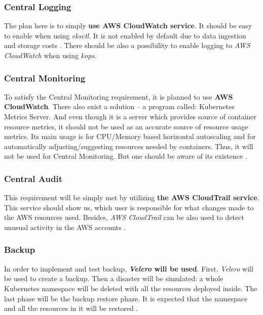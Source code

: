 \subsubsection{Central Logging}

The plan here is to simply \textbf{use AWS CloudWatch service}. It should be easy to enable when using \textit{eksctl}. It is not enabled by default due to data ingestion and storage costs \cite{eksctl-cw}. There should be also a possibility to enable logging to \textit{AWS CloudWatch} when using \textit{kops}.

\subsubsection{Central Monitoring}

To satisfy the Central Monitoring requirement, it is planned to use \textbf{AWS CloudWatch}. There also exist a solution -- a program called: Kubernetes Metrics Server. And even though it is a server which provides source of container resource metrics, it should not be used as an accurate source of resource usage metrics. Its main usage is for CPU/Memory based horizontal autoscaling and for automatically adjusting/suggesting resources needed by containers. Thus, it will not be used for Central Monitoring. But one should be aware of its existence \cite{k8s-metrics-server}.


\subsubsection{Central Audit}

This requirement will be simply met by utilizing \textbf{the AWS CloudTrail service}. This service should show us, which user is responsible for what changes made to the AWS resources used. Besides, \textit{AWS CloudTrail} can be also used to detect unusual activity in the AWS accounts \cite{online-ct}.

\subsubsection{Backup}

In order to implement and test backup, \textbf{\textit{Velero} will be used}. First, \textit{Velero} will be used to create a backup. Then a disaster will be simulated: a whole Kubernetes namespace will be deleted with all the resources deployed inside. The last phase will be the backup restore phaze. It is expected that the namespace and all the resources in it will be restored \cite{eksworkshop-backup,velero-examples}.

